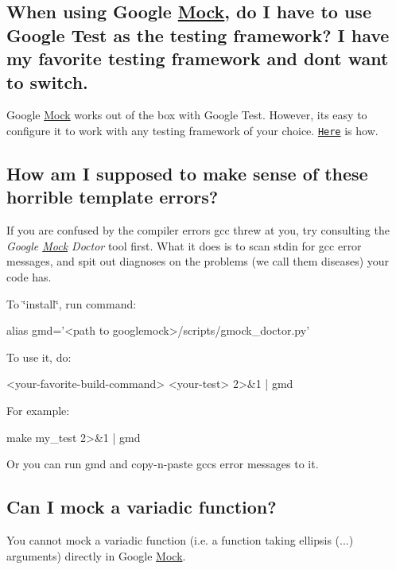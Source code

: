 \subsection*{When using Google \hyperlink{class_mock}{Mock}, do I have to use Google Test as the testing framework? I have my favorite testing framework and don\textquotesingle{}t want to switch.}

Google \hyperlink{class_mock}{Mock} works out of the box with Google Test. However, it\textquotesingle{}s easy to configure it to work with any testing framework of your choice. \href{http://code.google.com/p/googlemock/wiki/V1_6_ForDummies#Using_Google_Mock_with_Any_Testing_Framework}{\tt Here} is how.

\subsection*{How am I supposed to make sense of these horrible template errors?}

If you are confused by the compiler errors gcc threw at you, try consulting the {\itshape Google \hyperlink{class_mock}{Mock} Doctor} tool first. What it does is to scan stdin for gcc error messages, and spit out diagnoses on the problems (we call them diseases) your code has.

To \char`\"{}install\char`\"{}, run command\+: 
\begin{DoxyCode}
alias gmd='<path to googlemock>/scripts/gmock\_doctor.py'
\end{DoxyCode}


To use it, do\+: 
\begin{DoxyCode}
<your-favorite-build-command> <your-test> 2>&1 | gmd
\end{DoxyCode}


For example\+: 
\begin{DoxyCode}
make my\_test 2>&1 | gmd
\end{DoxyCode}


Or you can run {\ttfamily gmd} and copy-\/n-\/paste gcc\textquotesingle{}s error messages to it.

\subsection*{Can I mock a variadic function?}

You cannot mock a variadic function (i.\+e. a function taking ellipsis ({\ttfamily ...}) arguments) directly in Google \hyperlink{class_mock}{Mock}.

